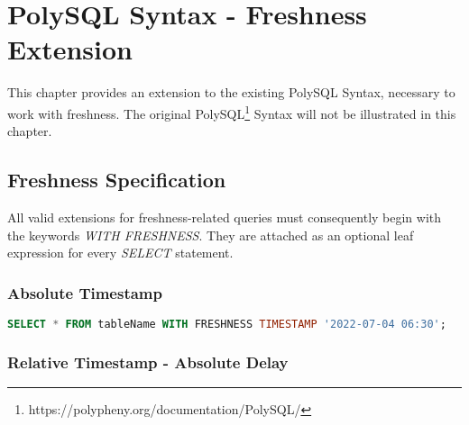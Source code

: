 \chapter{PolySQL Syntax - Freshness Extension}


This chapter provides an extension to the existing PolySQL Syntax, necessary to work with freshness.
The original PolySQL\footnote{https://polypheny.org/documentation/PolySQL/} Syntax will not be illustrated in this chapter.

\tocless\section{Freshness Specification}
\label{a:syntax}

All valid extensions for freshness-related queries must consequently begin with the keywords \emph{WITH FRESHNESS}.
They are attached as an optional leaf expression for every \emph{SELECT} statement.

\tocless\subsection{Absolute Timestamp}

\begin{lstlisting}[language=sql]
    SELECT * FROM tableName WITH FRESHNESS TIMESTAMP '2022-07-04 06:30';
\end{lstlisting}
\vspace*{-5mm}
\tocless\subsection{Relative Timestamp - Absolute Delay}

